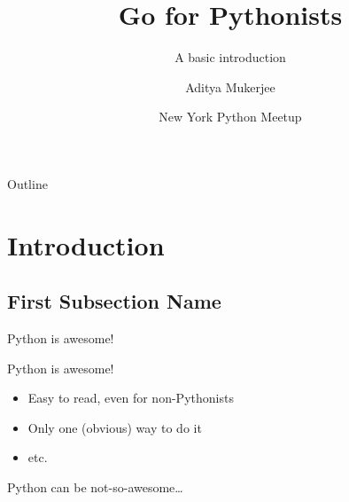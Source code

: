 \documentclass{beamer}
\title[Go for Pythonists] %
{Go for Pythonists}
\subtitle
{A basic introduction} %
\author[Aditya Mukerjee] %
{Aditya Mukerjee}
\date[March 7, 2013] %
{New York Python Meetup}
\begin{document}
\begin{frame}
  \titlepage
\end{frame}

\begin{frame}{Outline}
  \tableofcontents
\end{frame}




\section{Introduction}

\subsection[Short First Subsection Name]{First Subsection Name}

\begin{frame}{}
    \begin{center}
        Python is awesome!
    \end{center}
\end{frame}

\begin{frame}{Python is awesome!}

  \begin{itemize}
          \pause
  \item
      Easy to read, even for non-Pythonists
      \pause
  \item
      Only one (obvious) way to do it
      \pause
  \item
      etc.
  \end{itemize}
\end{frame}

\begin{frame}{}
    \begin{center}
        Python can be not-so-awesome\dots
    \end{center}
\end{frame}
\end{document}
